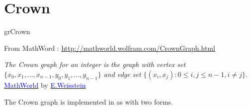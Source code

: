 \newpage\section{Crown}\label{crown}
\begin{NewMacroBox}{grCrown}{}


\medskip
From MathWord : \url{http://mathworld.wolfram.com/CrownGraph.html}  

\emph{The Crown graph  for an integer  is the graph with vertex set
$\{x_0,x_1,\dots,x_{n-1},y_0,y_1,\dots,y_{n-1}\}$\hfill\break
and edge set \hfill\break
$\{(x_i,x_j): 0\leq i,j\leq n-1,i \not=j\}$.}
\href{http://mathworld.wolfram.com/topics/GraphTheory.html}%
           {\textcolor{blue}{MathWorld}} by \href{http://en.wikipedia.org/wiki/Eric_W._Weisstein}%
           {\textcolor{blue}{E.Weisstein}}

\medskip
The Crown graph is implemented in  as  with two forms.
\end{NewMacroBox}


\subsection{}

\begin{center}
\begin{tkzexample}[vbox]
\end{tkzexample} 

\end{center}

\vfill\newpage
\subsection{}

\begin{center}
\begin{tkzexample}[vbox]
\end{tkzexample} 
\end{center}

\endinput